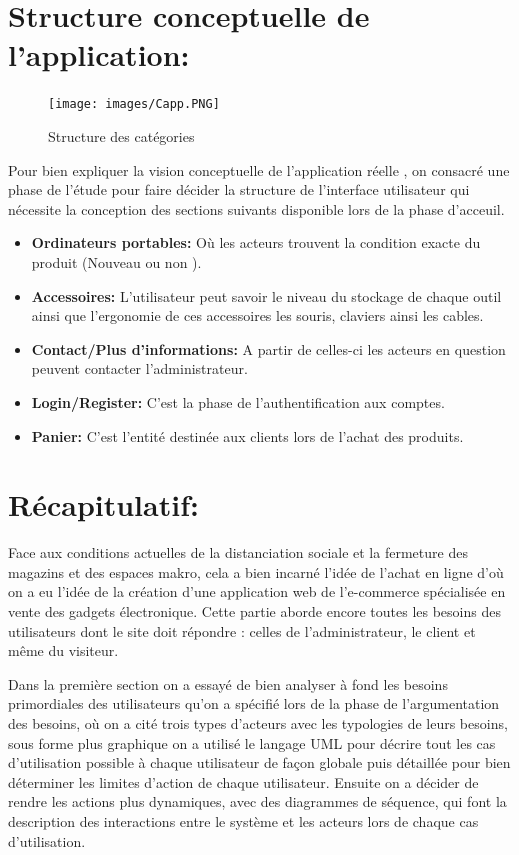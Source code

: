 \documentclass[a4paper,12pt]{report}
\begin{document}
\begin{doublespace}
\begin{doublespace}
\begin{doublespace}
\begin{doublespace}
\begin{doublespace}
\section{Structure conceptuelle de l'application:}
\begin{figure}[H]
\begin{center}
 \texttt{[image: images/Capp.PNG]}
 \caption{Structure des catégories}
 \end{center}
\end{figure}
Pour bien expliquer la vision conceptuelle de l'application réelle , on consacré une phase de l'étude pour faire décider la structure de l'interface utilisateur  qui nécessite la conception des  sections suivants  disponible lors de la phase d'acceuil.
\begin{itemize}
    \item \textbf{Ordinateurs portables:} Où les acteurs trouvent la condition exacte du produit (Nouveau ou non ).
    \item \textbf{Accessoires:} L'utilisateur peut savoir le niveau du stockage de chaque outil ainsi que l'ergonomie de ces accessoires les souris, claviers ainsi les cables.
    \item \textbf{Contact/Plus d'informations:} A partir de celles-ci les acteurs en question peuvent contacter l'administrateur.
    \item \textbf{Login/Register:} C'est la phase de l'authentification aux comptes.
    \item \textbf{Panier:} C'est l'entité destinée aux clients lors de l'achat des produits.
    
\end{itemize}


\newpage
\section{Récapitulatif:}
Face aux conditions actuelles de la distanciation sociale et la fermeture des magazins et des espaces makro, cela a bien incarné l'idée de l'achat en ligne d'où on a eu l'idée de la création d’une application web de l'e-commerce spécialisée en vente des gadgets électronique. Cette partie aborde encore toutes les besoins des utilisateurs dont le site doit répondre : celles de l’administrateur, le client  et même du visiteur.

Dans la première section on a essayé de bien analyser à fond les besoins primordiales des utilisateurs qu'on a spécifié lors de la phase de l'argumentation des besoins, où on a cité trois types d'acteurs avec les typologies de leurs besoins, sous forme plus graphique on a utilisé le langage UML pour décrire tout les cas d'utilisation possible à chaque utilisateur de façon globale puis  détaillée pour bien déterminer les limites d'action de chaque utilisateur.
Ensuite on a décider de rendre les actions plus dynamiques, avec des diagrammes de séquence, qui font la description des interactions entre le système et les acteurs lors de chaque cas d'utilisation. 






\end{doublespace}
\end{doublespace}
\end{doublespace}
\end{doublespace}
\end{doublespace}
\end{document}
